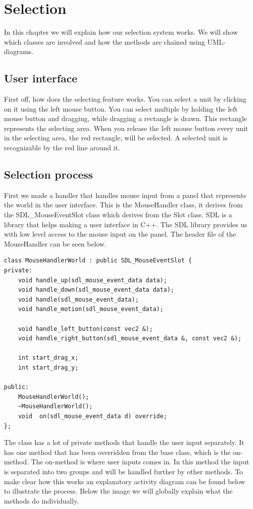 \section{Selection}
In this chapter we will explain how our selection system works. We will show which classes are involved and how the methods are chained using UML-diagrams. 

\subsection{User interface}
First off, how does the selecting feature works. You can select a unit by clicking on it using the left mouse button. You can select multiple by holding the left mouse button and dragging, while dragging a rectangle is drawn. This rectangle represents the selecting area. When you release the left mouse button every unit in the selecting area, the red rectangle, will be selected. A selected unit is recognizable by the red line around it.

\subsection{Selection process}
First we made a handler that handles mouse input from a panel that represents the world in the user interface. This is the MouseHandler class, it derives from the SDL\_MouseEventSlot class which derives from the Slot class. SDL is a library that helps making a user interface in C++. The SDL library provides us with low level access to the mouse input on the panel. The header file of the MouseHandler can be seen below.

\begin{lstlisting}
class MouseHandlerWorld : public SDL_MouseEventSlot {
private:
    void handle_up(sdl_mouse_event_data data);
    void handle_down(sdl_mouse_event_data data);
    void handle(sdl_mouse_event_data);
    void handle_motion(sdl_mouse_event_data);

    void handle_left_button(const vec2 &);
    void handle_right_button(sdl_mouse_event_data &, const vec2 &);

    int start_drag_x;
    int start_drag_y;

public:
    MouseHandlerWorld();
    ~MouseHandlerWorld();
    void  on(sdl_mouse_event_data d) override;
};
\end{lstlisting}

The class has a lot of private methods that handle the user input separately. It has one method that has been overridden from the base class, which is the on-method. The on-method is where user inputs comes in. In this method the input is separated into two groups and will be handled further by other methods. To make clear how this works an explanatory activity diagram can be found below to illustrate the process. Below the image we will globally explain what the methods do individually. 

